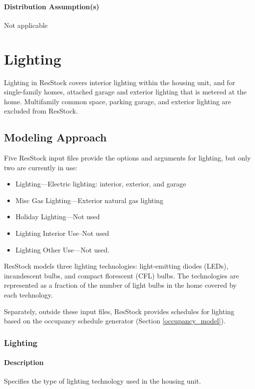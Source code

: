 \paragraph{Distribution Assumption(s)}
Not applicable


\section{Lighting}
Lighting in ResStock covers interior lighting within the housing unit, and for single-family homes, attached garage and exterior lighting that is metered at the home. Multifamily common space, parking garage, and exterior lighting are excluded from ResStock. 

\subsection{Modeling Approach}
Five ResStock input files provide the options and arguments for lighting, but only two are currently in use:
\begin{itemize}
    \item{Lighting}---Electric lighting: interior, exterior, and garage 
    \item{Misc Gas Lighting}---Exterior natural gas lighting
    \item{Holiday Lighting}---Not used
    \item{Lighting Interior Use}--Not used
    \item{Lighting Other Use}---Not used.
\end{itemize}

ResStock models three lighting technologies: light-emitting diodes (LEDs), incandescent bulbs, and compact florescent (CFL) bulbs. The technologies are represented as a fraction of the number of light bulbs in the home covered by each technology.

Separately, outside these input files, ResStock provides schedules for lighting based on the occupancy schedule generator (Section \ref{occupancy_model}).

\subsubsection{Lighting}\label{lighting}

\paragraph{Description}
Specifies the type of lighting technology used in the housing unit.

